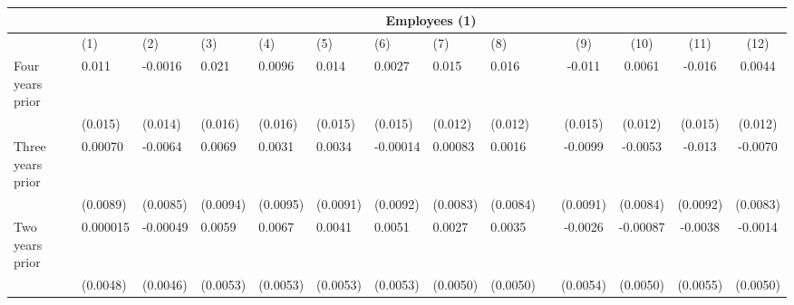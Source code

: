 \begin{tabular}{lccccrrrrrcccc}
\toprule
      & \multicolumn{13}{c}{Employees (1)} \\
\midrule
      & \multicolumn{1}{l}{(1)} & \multicolumn{1}{l}{(2)} & \multicolumn{1}{l}{(3)} & \multicolumn{1}{l}{(4)} & \multicolumn{1}{l}{(5)} & \multicolumn{1}{l}{(6)} & \multicolumn{1}{l}{(7)} & \multicolumn{1}{l}{(8)} &       & (9)   & (10)  & (11)  & (12) \\
\midrule
\midrule
Four years prior & \multicolumn{1}{l}{0.011} & \multicolumn{1}{l}{-0.0016} & \multicolumn{1}{l}{0.021} & \multicolumn{1}{l}{0.0096} & \multicolumn{1}{l}{0.014} & \multicolumn{1}{l}{0.0027} & \multicolumn{1}{l}{0.015} & \multicolumn{1}{l}{0.016} &       & -0.011 & 0.0061 & -0.016 & 0.0044 \\
      & \multicolumn{1}{l}{(0.015)} & \multicolumn{1}{l}{(0.014)} & \multicolumn{1}{l}{(0.016)} & \multicolumn{1}{l}{(0.016)} & \multicolumn{1}{l}{(0.015)} & \multicolumn{1}{l}{(0.015)} & \multicolumn{1}{l}{(0.012)} & \multicolumn{1}{l}{(0.012)} &       & (0.015) & (0.012) & (0.015) & (0.012) \\
Three years prior & \multicolumn{1}{l}{0.00070} & \multicolumn{1}{l}{-0.0064} & \multicolumn{1}{l}{0.0069} & \multicolumn{1}{l}{0.0031} & \multicolumn{1}{l}{0.0034} & \multicolumn{1}{l}{-0.00014} & \multicolumn{1}{l}{0.00083} & \multicolumn{1}{l}{0.0016} &       & -0.0099 & -0.0053 & -0.013 & -0.0070 \\
      & \multicolumn{1}{l}{(0.0089)} & \multicolumn{1}{l}{(0.0085)} & \multicolumn{1}{l}{(0.0094)} & \multicolumn{1}{l}{(0.0095)} & \multicolumn{1}{l}{(0.0091)} & \multicolumn{1}{l}{(0.0092)} & \multicolumn{1}{l}{(0.0083)} & \multicolumn{1}{l}{(0.0084)} &       & (0.0091) & (0.0084) & (0.0092) & (0.0083) \\
Two years prior & \multicolumn{1}{l}{0.000015} & \multicolumn{1}{l}{-0.00049} & \multicolumn{1}{l}{0.0059} & \multicolumn{1}{l}{0.0067} & \multicolumn{1}{l}{0.0041} & \multicolumn{1}{l}{0.0051} & \multicolumn{1}{l}{0.0027} & \multicolumn{1}{l}{0.0035} &       & -0.0026 & -0.00087 & -0.0038 & -0.0014 \\
      & \multicolumn{1}{l}{(0.0048)} & \multicolumn{1}{l}{(0.0046)} & \multicolumn{1}{l}{(0.0053)} & \multicolumn{1}{l}{(0.0053)} & \multicolumn{1}{l}{(0.0053)} & \multicolumn{1}{l}{(0.0053)} & \multicolumn{1}{l}{(0.0050)} & \multicolumn{1}{l}{(0.0050)} &       & (0.0054) & (0.0050) & (0.0055) & (0.0050) \\

\end{tabular}

